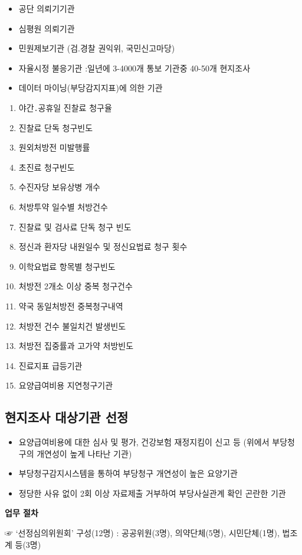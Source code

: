 \begin{itemize}\tightlist
\item 공단 의뢰기기관 
\item 심평원 의뢰기관 
\item 민원제보기관 (검.경찰 권익위, 국민신고마당)
\item 자율시정 불응기관 :일년에 3-4000개 통보 기관중 40-50개 현지조사
\item 데이터 마이닝(부당감지지표)에 의한 기관 
\end{itemize}
\begin{enumerate}[①]\tightlist
\item 야간․공휴일 진찰료 청구율 
\item 진찰료 단독 청구빈도
\item 원외처방전 미발행률 
\item 초진료 청구빈도
\item 수진자당 보유상병 개수 
\item 처방투약 일수별 처방건수
\item 진찰료 및 검사료 단독 청구 빈도
\item 정신과 환자당 내원일수 및 정신요법료 청구 횟수
\item 이학요법료 항목별 청구빈도 
\item 처방전 2개소 이상 중복 청구건수
\item 약국 동일처방전 중복청구내역 
\item 처방전 건수 불일치건 발생빈도
\item 처방전 집중률과 고가약 처방빈도 
\item 진료지표 급등기관 
\item 요양급여비용 지연청구기관
\end{enumerate}

\subsection{현지조사 대상기관 선정}
\begin{itemize}\tightlist
\item 요양급여비용에 대한 심사 및 평가, 건강보험 재정지킴이 신고 등
 (위에서 부당청구의 개연성이 높게 나타난 기관)
\item 부당청구감지시스템을 통하여 부당청구 개연성이 높은 요양기관
\item 정당한 사유 없이 2회 이상 자료제출 거부하여 부당사실관계 확인 곤란한 기관
\end{itemize}
\textbf{업무 절차}\par
{}\par
{}\par
☞ ‘선정심의위원회’ 구성(12명) : 공공위원(3명), 의약단체(5명), 시민단체(1명), 법조계 등(3명)\par \medskip

